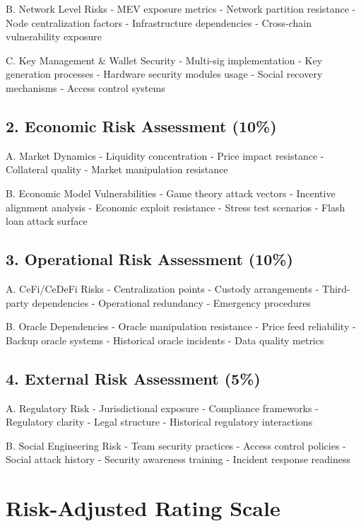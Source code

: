 \documentclass[
  letterpaper,
  DIV=11,
  numbers=noendperiod]{scrreprt}
\begin{document}
B. Network Level Risks - MEV exposure metrics - Network partition
resistance - Node centralization factors - Infrastructure dependencies -
Cross-chain vulnerability exposure

C. Key Management \& Wallet Security - Multi-sig implementation - Key
generation processes - Hardware security modules usage - Social recovery
mechanisms - Access control systems

\subsection{2. Economic Risk Assessment
(10\%)}\label{economic-risk-assessment-10}

A. Market Dynamics - Liquidity concentration - Price impact resistance -
Collateral quality - Market manipulation resistance

B. Economic Model Vulnerabilities - Game theory attack vectors -
Incentive alignment analysis - Economic exploit resistance - Stress test
scenarios - Flash loan attack surface

\subsection{3. Operational Risk Assessment
(10\%)}\label{operational-risk-assessment-10}

A. CeFi/CeDeFi Risks - Centralization points - Custody arrangements -
Third-party dependencies - Operational redundancy - Emergency procedures

B. Oracle Dependencies - Oracle manipulation resistance - Price feed
reliability - Backup oracle systems - Historical oracle incidents - Data
quality metrics

\subsection{4. External Risk Assessment
(5\%)}\label{external-risk-assessment-5}

A. Regulatory Risk - Jurisdictional exposure - Compliance frameworks -
Regulatory clarity - Legal structure - Historical regulatory
interactions

B. Social Engineering Risk - Team security practices - Access control
policies - Social attack history - Security awareness training -
Incident response readiness

\section{Risk-Adjusted Rating Scale}\label{risk-adjusted-rating-scale}
\end{document}
